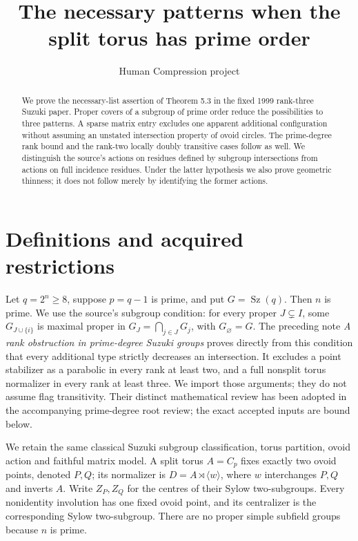 \documentclass[11pt,a4paper]{article}
\title{The necessary patterns when the split torus has prime order}
\author{Human Compression project}\date{}
\newcommand{\Sz}{\operatorname{Sz}}
\newcommand{\gen}[1]{\langle#1\rangle}
\begin{document}
\maketitle
\begin{abstract}
We prove the necessary-list assertion of Theorem 5.3 in the fixed 1999
rank-three Suzuki paper. Proper covers of a subgroup of prime order
reduce the possibilities to three patterns. A sparse matrix entry excludes
one apparent additional configuration without assuming an unstated
intersection property of ovoid circles. The prime-degree rank bound and
the rank-two locally doubly transitive cases follow as well. We distinguish
the source's actions on residues defined by subgroup intersections from
actions on full incidence residues. Under the latter hypothesis we also
prove geometric thinness; it does not follow merely by identifying the
former actions.
\end{abstract}

\section{Definitions and acquired restrictions}
Let $q=2^n\ge8$, suppose $p=q-1$ is prime, and put $G=\Sz(q)$.
Then $n$ is prime. We use the source's subgroup condition: for every
proper $J\subsetneq I$, some $G_{J\cup\{i\}}$ is maximal proper in
$G_J=\bigcap_{j\in J}G_j$, with $G_\varnothing=G$.
The preceding note \emph{A rank obstruction in prime-degree Suzuki groups}
proves directly from this condition that every additional type strictly
decreases an intersection. It excludes a point stabilizer as a parabolic
in every rank at least two, and a full nonsplit torus normalizer in every
rank at least three. We import those arguments; they do not assume flag
transitivity. Their distinct mathematical review has been adopted in the accompanying
prime-degree root review; the exact accepted inputs are bound below.

We retain the same classical Suzuki subgroup classification, torus
partition, ovoid action and faithful matrix model. A split torus $A=C_p$
fixes exactly two ovoid points, denoted $P,Q$; its normalizer is
$D=A\rtimes\gen w$, where $w$ interchanges $P,Q$ and inverts $A$.
Write $Z_P,Z_Q$ for the centres of their Sylow two-subgroups. Every
nonidentity involution has one fixed ovoid point, and its centralizer is
the corresponding Sylow two-subgroup. There are no proper simple subfield
groups because $n$ is prime.
\end{document}
